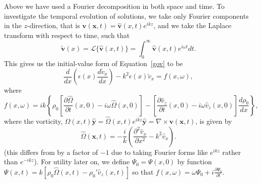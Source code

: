 \documentclass{aastex61}
\begin{document}
Above we have used a Fourier decomposition in both space and time. To investigate the temporal evolution of solutions, we take only Fourier components in the $z$-direction, that is $\mathbf{v}(\mathbf{x},t) = \mathbf{\hat{v}}(x,t)e^{ikz}$, and we take the Laplace transform with respect to time, such that
\begin{equation}
\mathbf{\tilde{v}}(x) = \mathcal{L}\{\mathbf{\hat{v}}(x, t)\} = \int_0^\infty \mathbf{\widehat{v}}(x,t)e^{i\omega t} dt.
\end{equation}
This gives us the initial-value form of Equation~\eqref{gov} to be
\begin{equation}
\frac{d}{dx}\left(\epsilon(x) \frac{d\tilde{v}_x}{dx}\right) - k^2\epsilon(x)\tilde{v}_x = f(x, \omega),
\label{ivp gov}
\end{equation}
where
\begin{equation}
f(x, \omega) = ik\left\{\rho_0\left[\frac{\partial\hat{\Omega}}{\partial t}(x,0) - i\omega\hat{\Omega}(x,0)\right] - \left[\frac{\partial\hat{v}_z}{\partial t}(x,0) - i\omega \hat{v}_z(x,0)\right]\frac{d\rho_0}{dx}\right\},
\label{f}
\end{equation}
where the vorticity, $\Omega(x,t)\mathbf{\hat{y}} = \hat{\Omega}(x,t)e^{ikz}\mathbf{\hat{y}} = \nabla \times \mathbf{v}(\mathbf{x},t)$, is given by
\begin{equation}
\hat{\Omega}(\mathbf{x},t) = -\frac{i}{k}\left(\frac{\partial^2\hat{v}_x}{\partial x^2} - k^2 \hat{v}_x\right).
\end{equation}
(this differs from \cite{rae_etal81} by a factor of $-1$ due to taking Fourier forms like $e^{ikz}$ rather than $e^{-ikz}$). For utility later on, we define $\Psi_0 = \Psi(x, 0)$ by function $\Psi(x, t) = k[\rho_0\hat{\Omega}(x, t) - \rho_0'\hat{v}_z(x, t)]$ so that $f(x, \omega) = \omega \Psi_0 + i\frac{\partial \Psi_0}{\partial t}$.
\end{document}
